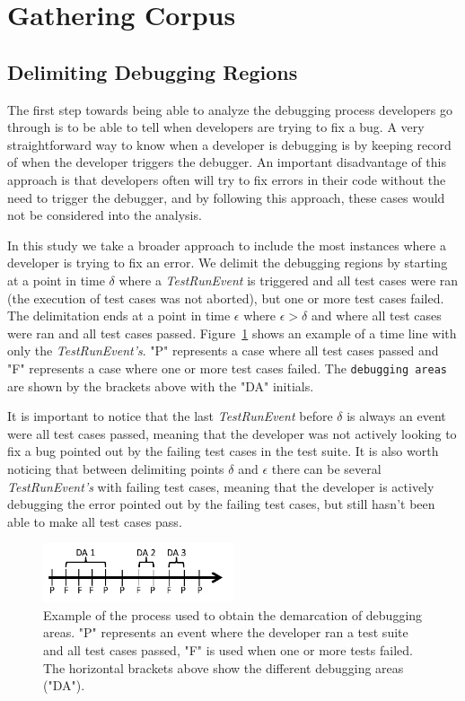 \documentclass[sigconf]{acmart}
\begin{document}
\section{Gathering Corpus}
\subsection{Delimiting Debugging Regions}
The first step towards being able to analyze the debugging
process developers go through is to be able to tell when
developers are trying to fix a bug. A very straightforward 
way to know when a developer is debugging is by keeping
record of when the developer triggers the debugger. An important
disadvantage of this approach is that 
developers often will try to fix errors in their code without the
need to trigger the debugger, and by following this approach,
these cases would not
be considered into the analysis.

In this study we take a broader approach to include the most 
instances where a developer is trying to fix an error.
We delimit the debugging regions by starting at a point
in time $\delta$ where a \textit{TestRunEvent} is triggered and 
all test cases were ran (the execution of test cases
was not aborted), but one or more test cases failed.
The delimitation ends at a point in time $\epsilon $ where $ \epsilon > \delta$ 
and where all test cases were ran and all test cases passed.
Figure~\ref{demarcations} shows an example of a time line
with only the \textit{TestRunEvent's}. "P" represents a case
where all test cases passed and "F" represents a case where one
or more test cases failed. The \texttt{debugging areas} are shown by
the brackets above with the "DA" initials. 


It is important to notice that the last \textit{TestRunEvent} before $\delta$ 
is always an event were all test cases passed, meaning that the
developer was not actively looking to fix a bug pointed out by the
failing test cases in the test suite. It is also worth noticing
that between delimiting points $\delta$ and $\epsilon$ there can be 
several \textit{TestRunEvent's} with failing test cases, meaning
that the developer is actively debugging the error pointed out
by the failing test cases, but still hasn't been able to make
all test cases pass.

\begin{figure}[h]
\label{demarcations}
\caption{Example of the process used to obtain the demarcation of
debugging areas. "P" 
represents an event where the developer ran a test suite and all test cases
passed, "F" is used when one or more tests failed. The horizontal brackets
above show the different debugging areas ("DA").}
\centering
\includegraphics[width=0.5\textwidth]{images/demarcations.png}
\end{figure}
\end{document}
